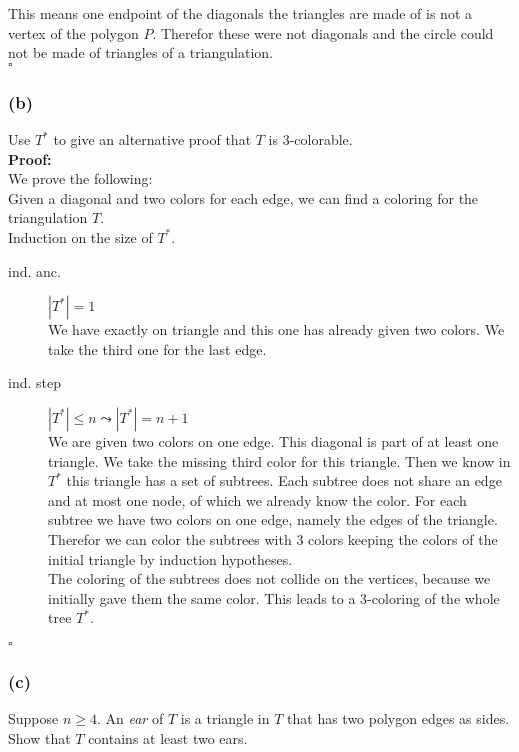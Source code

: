 \documentclass[11pt,a4paper,ngerman]{article}
\begin{document}
This means one endpoint of the diagonals the triangles are made of is not a vertex of the polygon $P$. Therefor these
were not diagonals and the circle could not be made of triangles of a triangulation.\\
\mbox{}\hfill$\square$

\subsubsection*{(b)}

Use $T^*$ to give an alternative proof that $T$ is 3-colorable.\\

\textbf{Proof:}\\

We prove the following:\\
Given a diagonal and two colors for each edge, we can find a coloring for the triangulation $T$.\\
Induction on the size of $T^*$.
\begin{description}
    \item[ind. anc.] $|T^*| = 1$\\
        We have exactly on triangle and this one has already given two colors. We take the third one
        for the last edge.
    \item[ind. step] $|T^*| \leq n \leadsto |T^*| = n+1$\\
        We are given two colors on one edge. This diagonal is part of at least one triangle. We take the missing
        third color for this triangle. Then we know in $T^*$ this triangle has a set of subtrees. Each subtree does not share
        an edge and at most one node, of which we already know the color. For each subtree we have two colors on one edge, namely
        the edges of the triangle. Therefor we can color the subtrees with 3 colors keeping the colors of the initial triangle
        by induction hypotheses.\\

        The coloring of the subtrees does not collide on the vertices,  because we initially gave them the same color.
        This leads to a 3-coloring of the whole tree $T^*$.
\end{description}
\mbox{}\hfill $\square$

\subsubsection*{(c)}

Suppose $n \geq 4$. An \emph{ear} of $T$ is a triangle in $T$ that has two polygon edges
as sides. Show that $T$ contains at least two ears.\\
\end{document}

